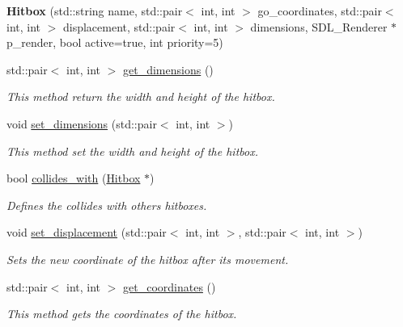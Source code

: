 \begin{DoxyCompactItemize}
\item 
{\bfseries Hitbox} (std\+::string name, std\+::pair$<$ int, int $>$ go\+\_\+coordinates, std\+::pair$<$ int, int $>$ displacement, std\+::pair$<$ int, int $>$ dimensions, S\+D\+L\+\_\+\+Renderer $\ast$p\+\_\+render, bool active=true, int priority=5)\hypertarget{classengine_1_1_hitbox_a5900c5e7899ab60e3c9f388bdf3d6a1a}{}\label{classengine_1_1_hitbox_a5900c5e7899ab60e3c9f388bdf3d6a1a}

\item 
std\+::pair$<$ int, int $>$ \hyperlink{classengine_1_1_hitbox_a6383a8d5f77c30dde5fac8f3d3089504}{get\+\_\+dimensions} ()
\begin{DoxyCompactList}\small\item\em This method return the width and height of the hitbox. \end{DoxyCompactList}\item 
void \hyperlink{classengine_1_1_hitbox_add67edc1c8aefeb1379ce5083c518993}{set\+\_\+dimensions} (std\+::pair$<$ int, int $>$)
\begin{DoxyCompactList}\small\item\em This method set the width and height of the hitbox. \end{DoxyCompactList}\item 
bool \hyperlink{classengine_1_1_hitbox_ab3528c88c18c2b671a5b7b39d0bb9fdf}{collides\+\_\+with} (\hyperlink{classengine_1_1_hitbox}{Hitbox} $\ast$)
\begin{DoxyCompactList}\small\item\em Defines the collides with others hitboxes. \end{DoxyCompactList}\item 
void \hyperlink{classengine_1_1_hitbox_a61fef55605a99e6b5df28a63aa131609}{set\+\_\+displacement} (std\+::pair$<$ int, int $>$, std\+::pair$<$ int, int $>$)
\begin{DoxyCompactList}\small\item\em Sets the new coordinate of the hitbox after its movement. \end{DoxyCompactList}\item 
std\+::pair$<$ int, int $>$ \hyperlink{classengine_1_1_hitbox_a7731c305c7a9c9a56b609e7b89d11cb2}{get\+\_\+coordinates} ()
\begin{DoxyCompactList}\small\item\em This method gets the coordinates of the hitbox. \end{DoxyCompactList}\item 

\end{DoxyCompactItemize}
